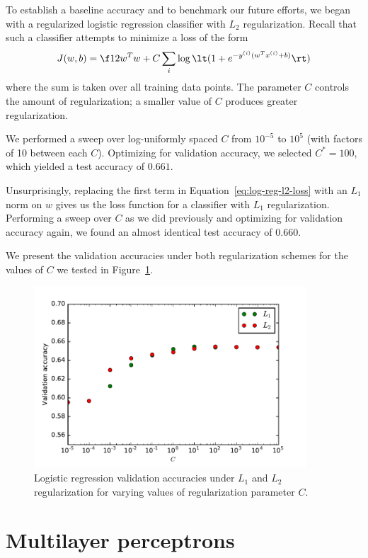 \documentclass{article}
\newcommand{\sind}[1]{^{(#1)}}
\begin{document}
\begin{multicols}{2}
To establish a baseline accuracy
and to benchmark our future efforts,
we began with a regularized logistic regression classifier
with $L_2$ regularization.
Recall that such a classifier attempts to minimize a loss of the form
\begin{equation}
    \label{eq:log-reg-l2-loss}
    J(w, b) = \f12 w^T w + C \sum_i \log\lt(1 + e^{-y\sind{i}(w^T x\sind{i} + b)}\rt)
\end{equation}
where the sum is taken over all training data points.
The parameter $C$ controls the amount of regularization;
a smaller value of $C$ produces greater regularization.

We performed a sweep over log-uniformly spaced $C$
from $10^{-5}$ to $10^5$ (with factors of 10 between each $C$).
Optimizing for validation accuracy,
we selected $C^* = 100$,
which yielded a test accuracy of $0.661$.

Unsurprisingly,
replacing the first term in Equation~\ref{eq:log-reg-l2-loss}
with an $L_1$ norm on $w$
gives us the loss function for a classifier with $L_1$ regularization.
Performing a sweep over $C$ as we did previously
and optimizing for validation accuracy again,
we found an almost identical test accuracy of $0.660$.

We present the validation accuracies
under both regularization schemes
for the values of $C$ we tested
in Figure~\ref{fig:log-reg-c-sweep}.

\begin{figure}[t] %
   \centering
   \includegraphics[width=4in]{img/log-reg-C-sweep.pdf}
   \caption{Logistic regression validation accuracies
   under $L_1$ and $L_2$ regularization
   for varying values of regularization parameter $C$.}
   \label{fig:log-reg-c-sweep}
\end{figure}

\section{Multilayer perceptrons}


\end{multicols}
\end{document}
